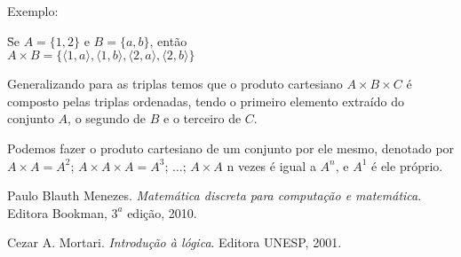 \documentclass[twoside,a4wide,12pt]{book}
\newcommand\ordpar[1]{{\langle #1\rangle}}%
\begin{document}
\noindent Exemplo:
\begin{tabbing}
\hspace{1cm}\=Se $A=\{1,2\}$ e $B=\{a,b\}$, então\\
\>$A\times B = \{\ordpar{1,a}, \ordpar{1,b},\ordpar{2,a},\ordpar{2,b}\}$\\
\end{tabbing}

Generalizando para as triplas temos que o produto cartesiano $A\times
B\times C$ é composto pelas triplas ordenadas, tendo o primeiro
elemento extraído do conjunto $A$, o segundo de $B$ e o terceiro de
$C$.

Podemos fazer o produto cartesiano de um conjunto por ele mesmo,
denotado por $A\times A=A^2$; $A\times A \times A=A^3$; $\ldots$; $A
\times A$ n vezes é igual a $A^n$, e $A^1$ é ele próprio.

\begin{thebibliography}{99}

 Paulo Blauth Menezes. \emph{Matemática discreta para
    computação e matemática}. Editora Bookman, $3^a$ edição, 2010.

 Cezar A. Mortari. \emph{Introdução à lógica}. Editora UNESP,
  2001.

\end{thebibliography}
\end{document}
